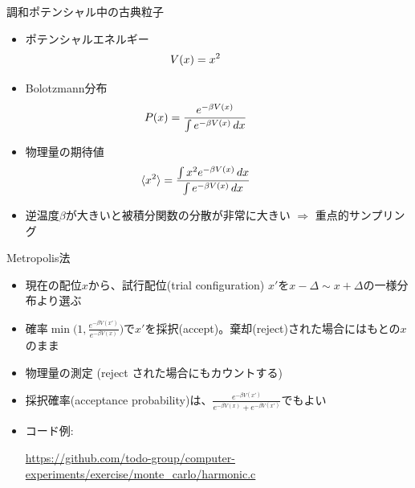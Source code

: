 \documentclass[dvipdfmx]{beamer}
\begin{document}
\begin{frame}[t,fragile]{調和ポテンシャル中の古典粒子}
  \begin{itemize}
    \setlength{\itemsep}{1em}
  \item ポテンシャルエネルギー
    \[ \hspace*{-4em} V(x) = x^2 \]
  \item Bolotzmann分布
    \[ \hspace*{-4em} P(x) = \frac{e^{-\beta V(x)}}{\int e^{-\beta V(x)} \, dx} \]
  \item 物理量の期待値
    \[ \hspace*{-4em} \langle x^2 \rangle = \frac{\int x^2 e^{-\beta V(x)} \, dx}{\int e^{-\beta V(x)} \, dx} \]
  \item 逆温度$\beta$が大きいと被積分関数の分散が非常に大きい $\Rightarrow$ 重点的サンプリング
  \end{itemize}
  \vspace*{-16em} \hfill
\end{frame}

\begin{frame}[t,fragile]{Metropolis法}
  \begin{itemize}
    \setlength{\itemsep}{1em}
  \item 現在の配位$x$から、試行配位(trial configuration) $x'$を$x - \Delta \sim x + \Delta$の一様分布より選ぶ
  \item 確率$\min \Big( 1, \frac{e^{-\beta V(x')}}{e^{-\beta V(x)}} \Big)$で$x'$を採択(accept)。棄却(reject)された場合にはもとの$x$のまま
  \item 物理量の測定 (reject された場合にもカウントする)
  \item 採択確率(acceptance probability)は、$\frac{e^{-\beta V(x')}}{e^{-\beta V(x)}+e^{-\beta V(x')}}$でもよい
  \item コード例:

    {\tiny \url{https://github.com/todo-group/computer-experiments/exercise/monte_carlo/harmonic.c}}
  \end{itemize}
\end{frame}
\end{document}
